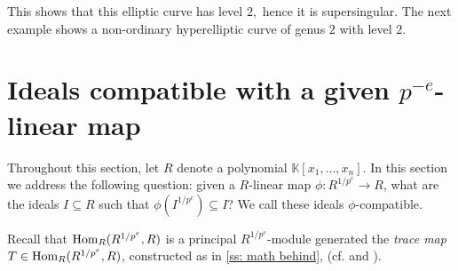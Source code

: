 \documentclass{amsart}
\renewcommand{\leq}{\leqslant}
\begin{document}
\medskip
{\small
{}
}\medskip

This shows that this elliptic curve has level $2,$ hence it is supersingular. The next example
shows a non-ordinary hyperelliptic curve of genus $2$ with level $2$.

\medskip
{\small
{}
}\medskip

\section{Ideals compatible with a given $p^{-e}$-linear map}\label{Section: compatible ideals}

Throughout this section, let $R$ denote a polynomial $\mathbb{K}[x_1, \dots, x_n]$.
In this section we address the following question:
given a $R$-linear map $\phi: R^{1/p^e} \rightarrow R$, what are the ideals $I\subseteq R$ such that $\phi(I^{1/p^e})\subseteq I$?
We call these ideals $\phi$-compatible.

Recall that  $\operatorname{Hom}_R( R^{1/p^e}, R)$  is a principal $R^{1/p^e}$-module generated
the \emph{trace map} $T\in \operatorname{Hom}_R(R^{1/p^e}, R)$, constructed as in \autoref{ss: math behind}, (cf. \cite[Lemma 1.6]{FedderFPureRat} and \cite[Example 1.3.1]{BrionKumarFrobeniusSplitting}).
%
%
\end{document}
